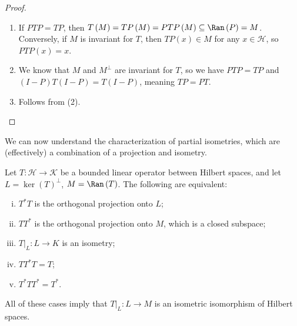 \documentclass[10pt]{mypackage}
\begin{document}
\begin{proof}\hfill
  \begin{enumerate}[(1)]
    \item If $PTP = TP$, then $T\left(M\right) = TP\left(M\right) = PTP\left(M\right)\subseteq \Ran\left(P\right) = M$. Conversely, if $M$ is invariant for $T$, then $TP(x)\in M$ for any $x\in \mathcal{H}$, so $PTP(x) = x$.
    \item We know that $M$ and $M^{\perp}$ are invariant for $T$, so we have $PTP = TP$ and $\left(I-P\right)T\left(I-P\right) = T\left(I-P\right)$, meaning $TP = PT$.
    \item Follows from (2).
  \end{enumerate}
\end{proof}
We can now understand the characterization of partial isometries, which are (effectively) a combination of a projection and isometry.
\begin{proposition}
  Let $T: \mathcal{H}\rightarrow \mathcal{K}$ be a bounded linear operator between Hilbert spaces, and let $L = \ker\left(T\right)^{\perp}$, $M = \Ran\left(T\right)$. The following are equivalent:
  \begin{enumerate}[(i)]
    \item $T^{\ast}T$ is the orthogonal projection onto $L$;
    \item $TT^{\ast}$ is the orthogonal projection onto $M$, which is a closed subspace;
    \item $T|_{L}\colon L\rightarrow K$ is an isometry;
    \item $TT^{\ast}T = T$;
    \item $T^{\ast}TT^{\ast} = T^{\ast}$.
  \end{enumerate}
  All of these cases imply that $T|_{L}\colon L\rightarrow M$ is an isometric isomorphism of Hilbert spaces.
\end{proposition}
\end{document}
